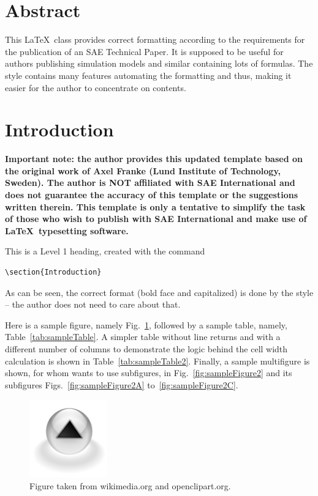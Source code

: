 \documentclass[letterpaper,times]{sae}
\begin{document}
\maketitle
\section{Abstract}
This \LaTeX\ class provides correct formatting according to the requirements
  for the publication of an SAE Technical Paper. It is supposed to be useful
  for authors publishing simulation models and similar containing lots of
  formulas. The style contains many features automating the formatting and
  thus, making it easier for the author to concentrate on contents. 

\section{Introduction}
\textbf{Important note: the author provides this updated template based on the original work of
Axel Franke (Lund Institute of Technology, Sweden).
The author is NOT affiliated with SAE International and does not guarantee
the accuracy of this template or the suggestions written therein.
This template is only a tentative to simplify the task of those who
wish to publish with SAE International and make use of \LaTeX\ typesetting software.}

This is a Level 1 heading, created with the command
\begin{verbatim}
\section{Introduction}
\end{verbatim}
As can be seen, the correct format (bold face and capitalized) is done by the
style -- the author does not need to care about that.

Here is a sample figure, namely Fig.~\ref{fig:sampleFigure}, followed by a sample table, namely, Table~\ref{tab:sampleTable}.
A simpler table without line returns and with a different number of columns to demonstrate the logic behind
the cell width calculation is shown in Table~\ref{tab:sampleTable2}. Finally,
a sample multifigure is shown, for whom wants to use subfigures, in Fig.~\ref{fig:sampleFigure2} and its subfigures
Figs.~\ref{fig:sampleFigure2A} to~\ref{fig:sampleFigure2C}.


\begin{figure}[!htb]
\centering
\includegraphics[width=0.3\textwidth]{sampleFigure}
\caption{Figure taken from wikimedia.org and openclipart.org.}
\label{fig:sampleFigure}
\end{figure}
\end{document}
